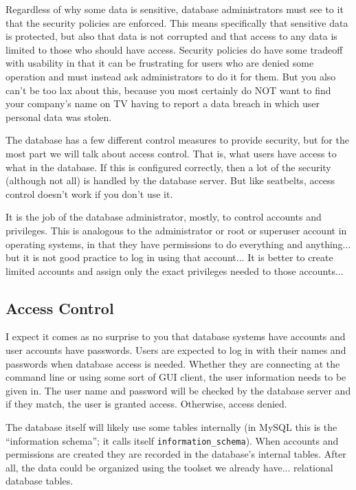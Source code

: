 \documentclass[a4paper]{report}
\begin{document}
Regardless of why some data is sensitive, database administrators must see to it that the security policies are enforced. This means specifically that sensitive data is protected, but also that data is not corrupted and that access to any data is limited to those who should have access. Security policies do have some tradeoff with usability in that it can be frustrating for users who are denied some operation and must instead ask administrators to do it for them. But you also can't be too lax about this, because you most certainly do NOT want to find your company's name on TV having to report a data breach in which user personal data was stolen.

The database has a few different control measures to provide security, but for the most part we will talk about access control. That is, what users have access to what in the database. If this is configured correctly, then a lot of the security (although not all) is handled by the database server. But like seatbelts, access control doesn't work if you don't use it.

It is the job of the database administrator, mostly, to control accounts and privileges. This is analogous to the administrator or root or superuser account in operating systems, in that they have permissions to do everything and anything... but it is not good practice to log in using that account... It is better to create limited accounts and assign only the exact privileges needed to those accounts...

\subsection*{Access Control}

I expect it comes as no surprise to you that database systems have accounts and user accounts have passwords. Users are expected to log in with their names and passwords when database access is needed. Whether they are connecting at the command line or using some sort of GUI client, the user information needs to be given in. The user name and password will be checked by the database server and if they match, the user is granted access. Otherwise, access denied.

The database itself will likely use some tables internally (in MySQL this is the ``information schema''; it calls itself \texttt{information\_schema}). When accounts and permissions are created they are recorded in the database's internal tables. After all, the data could be organized using the toolset we already have... relational database tables. 
\end{document}
